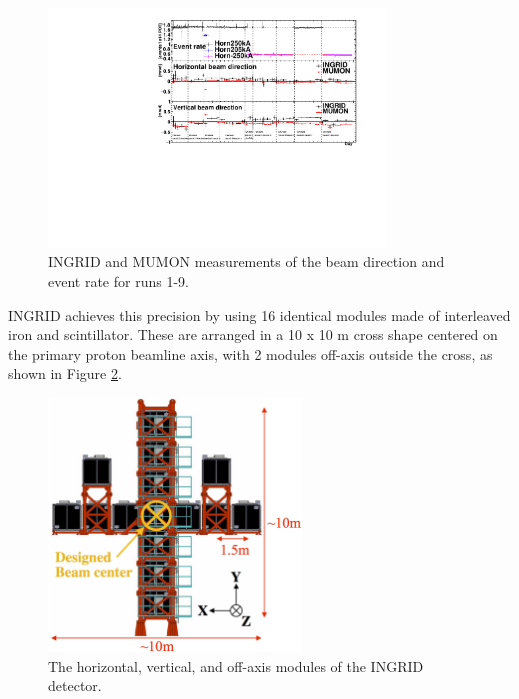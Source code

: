 \begin{figure}[!htbp]
\centering
\includegraphics*[width=0.8\textwidth,clip]{figs/mumoningrid}
\caption{INGRID and MUMON measurements of the beam direction and event rate for runs 1-9.} \label{mumoningrid}
\end{figure}

INGRID achieves this precision by using 16 identical modules made of interleaved iron and scintillator. These are arranged in a 10 x 10 m cross shape centered on the primary proton beamline axis, with 2 modules off-axis outside the cross, as shown in Figure \ref{ingridcross}. 

\begin{figure}[!htbp]
\centering
\includegraphics*[width=0.6\textwidth,clip]{figs/ingridcross}
\caption{The horizontal, vertical, and off-axis modules of the INGRID detector.} \label{ingridcross}
\end{figure}

